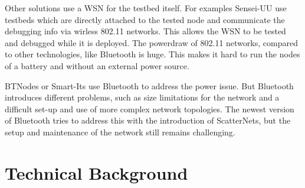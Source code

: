 Other solutions use a WSN for the testbed itself. For examples Sensei-UU \cite{Rensfelt2009} use testbeds which are directly attached to the tested node and communicate the debugging info via wirless 802.11 networks. This allows the WSN to be tested and debugged while it is deployed. The powerdraw of 802.11 networks, compared to other technologies, like Bluetooth is huge. This makes it hard to run the nodes of a battery and without an external power source.



BTNodes \cite{Moser} or Smart-Its \cite{Kasten2000} use Bluetooth to address the power issue. But Bluetooth introduces different problems, such as size limitations for the network and a difficult set-up and use of more complex network topologies. The newest version of Bluetooth tries to address this with the introduction of ScatterNets, but the setup and maintenance of the network still remains challenging.


\chapter{Technical Background}
